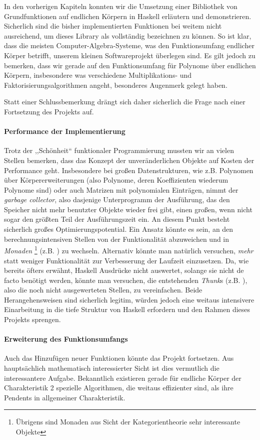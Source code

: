 In den vorherigen Kapiteln konnten wir die Umsetzung einer Bibliothek von
Grundfunktionen auf endlichen Körpern in Haskell erläutern und demonstrieren.
Sicherlich sind die bisher implementierten Funktionen bei weitem nicht
ausreichend, um dieses Library als vollständig bezeichnen zu können. So ist
klar, dass die meisten Computer-Algebra-Systeme, was den Funktionsumfang
endlicher Körper betrifft, unserem kleinen Softwareprojekt überlegen
sind. Es gilt jedoch zu bemerken, dass wir gerade auf den Funktionsumfang für 
Polynome über endlichen Körpern, insbesondere was verschiedene
Multiplikations- und Faktorisierungsalgorithmen angeht, besonderes Augenmerk
gelegt haben.

Statt einer Schlussbemerkung drängt sich daher sicherlich die Frage nach einer
Fortsetzung des Projekts auf.

\paragraph{Performance der Implementierung} Trotz der ,,Schönheit`` funktionaler
Programmierung mussten wir an vielen Stellen bemerken, dass das Konzept der
unveränderlichen Objekte auf Kosten der Performance geht. Insbesondere bei
großen Datenstrukturen, wie z.B. Polynomen über Körpererweiterungen (also
Polynome, deren Koeffizienten wiederum Polynome sind) oder auch Matrizen mit
polynomialen Einträgen, nimmt der \emph{garbage collector}, also dasjenige
Unterprogramm der Ausführung, das den Speicher nicht mehr benutzter Objekte
wieder frei gibt, einen großen, wenn nicht sogar den größten Teil der
Ausführungszeit ein. An diesem Punkt besteht sicherlich großes
Optimierungspotential. Ein Ansatz könnte es sein, an den berechnungsintensiven
Stellen von der Funktionalität abzuweichen und in \emph{Monaden}%
\footnote{Übrigens sind Monaden aus Sicht der Kategorientheorie sehr
interessante Objekte}
(z.B. \autocite{haskellwiki:monaden}) zu wechseln. Alternativ könnte man
natürlich versuchen, \emph{mehr} statt weniger Funktionalität
zur Verbesserung der Laufzeit einzusetzen. Da, wie bereits öfters erwähnt,
Haskell Ausdrücke nicht auswertet, solange sie nicht de facto benötigt werden,
könnte man versuchen, die entstehenden \emph{Thunk}s 
(z.B. \autocite{haskellwiki:thunk}), also die noch nicht ausgewerteten Stellen,
zu vereinfachen. Beide Herangehensweisen sind sicherlich legitim, würden 
jedoch eine weitaus intensivere Einarbeitung in die tiefe Struktur von Haskell
erfordern und den Rahmen dieses Projekts sprengen.

\paragraph{Erweiterung des Funktionsumfangs} Auch  das Hinzufügen neuer
Funktionen könnte das Projekt fortsetzen. Aus hauptsächlich
mathematisch interessierter Sicht ist dies vermutlich die interessantere 
Aufgabe. Bekanntlich existieren gerade für endliche Körper der Charakteristik 2 
spezielle Algorithmen, die weitaus effizienter sind, als ihre Pendents in
allgemeiner Charakteristik. 


